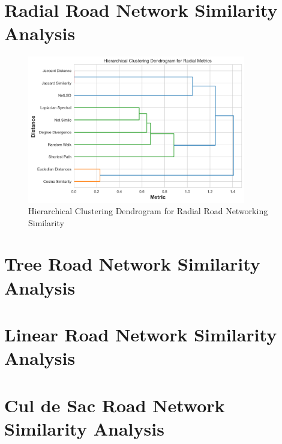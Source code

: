 \section{Radial Road Network Similarity Analysis}
\begin{figure}[!ht]
\centering
\includegraphics[width=0.85\textwidth,center]{picture/Radial/radial_metrics_dendrogram.png}
\caption[Hierarchical Clustering Dendrogram for Radial Road Networking Similarity]{Hierarchical Clustering Dendrogram for Radial Road Networking Similarity}
\label{fig:Hierarchical Clustering Dendrogram for Radial Road Networking Similarity}
\end{figure}

\section{Tree Road Network Similarity Analysis}
\section{Linear Road Network Similarity Analysis}
\section{Cul de Sac Road Network Similarity Analysis}
